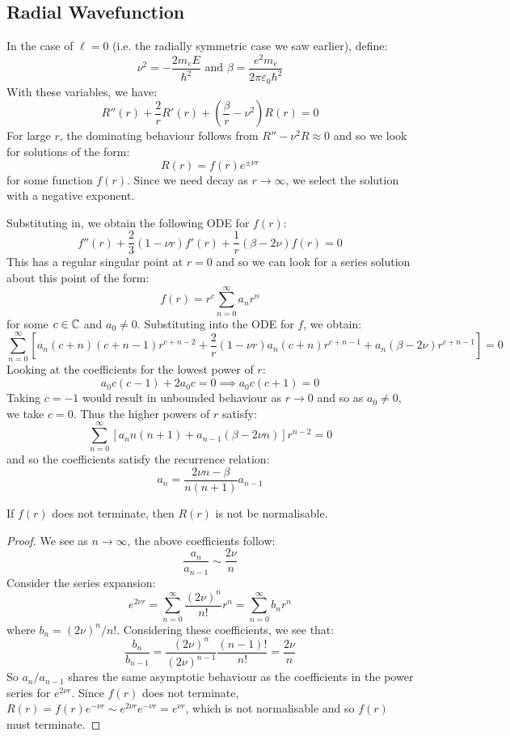 \documentclass[../main.tex]{subfiles}
\begin{document}
\subsection{Radial Wavefunction} \label{radialWF}
In the case of $\ell = 0$ (i.e. the radially symmetric case we saw earlier), define:
\[
  \nu^2 = -\frac{2m_eE}{\hbar^2} \text{ and } \beta = \frac{e^2m_e}{2\pi\varepsilon_0 \hbar^2}
\]
With these variables, we have:
\[
  R''(r) + \frac{2}{r}R'(r) + \left(\frac{\beta}{r} - \nu^2\right)R(r) = 0
\]
For large $r$, the dominating behaviour follows from $R'' - \nu^2 R \approx 0$ and so we look for solutions of the form:
\[
  R(r) = f(r) e^{\pm\nu r}
\]
for some function $f(r)$.
Since we need decay as $r \to \infty$, we select the solution with a negative exponent.

Substituting in, we obtain the following ODE for $f(r)$:
\[
  f''(r) + \frac{2}{3}(1 - \nu r)f'(r) + \frac{1}{r}(\beta - 2\nu) f(r) = 0
\]
This has a regular singular point at $r = 0$ and so we can look for a series solution about this point of the form:
\[
  f(r) = r^{c} \sum_{n = 0}^{\infty} a_n r^{n}
\]
for some $c \in \mathbb{C}$ and $a_0 \neq 0$.
Substituting into the ODE for $f$, we obtain:
\[
  \sum_{n = 0}^{\infty} \left[a_n(c + n)(c + n - 1)r^{c + n - 2} + \frac{2}{r}(1 - \nu r)a_n(c + n)r^{c + n - 1} + a_n(\beta - 2\nu)r^{c + n - 1}\right] = 0
\]
Looking at the coefficients for the lowest power of $r$:
\[
  a_0 c(c - 1) + 2a_0 c = 0 \implies a_0 c(c + 1) = 0
\]
Taking $c = -1$ would result in unbounded behaviour as $r \to 0$ and so as $a_0 \neq 0$, we take $c = 0$.
Thus the higher powers of $r$ satisfy:
\[
  \sum_{n = 0}^{\infty} \left[a_n n(n + 1) + a_{n - 1}(\beta - 2\nu n)\right]r^{n - 2} = 0
\]
and so the coefficients satisfy the recurrence relation:
\[
  a_n = \frac{2\nu n - \beta}{n(n + 1)}  a_{n - 1}
\]
\begin{proposition}
  If $f(r)$ does not terminate, then $R(r)$ is not be normalisable.
\end{proposition}
\begin{proof}
  We see as $n \to \infty$, the above coefficients follow:
  \[
    \frac{a_n}{a_{n - 1}} \sim \frac{2\nu}{n}
  \]
  Consider the series expansion:
  \[
    e^{2\nu r} = \sum_{n = 0}^{\infty} \frac{(2\nu)^{n}}{n!}r^{n} = \sum_{n = 0}^{\infty} b_n r^{n}
  \]
  where $b_n = (2\nu)^{n}/n!$.
  Considering these coefficients, we see that:
  \[
    \frac{b_n}{b_{n - 1}} = \frac{(2\nu)^{n}}{(2\nu)^{n - 1}} \frac{(n - 1)!}{n!} = \frac{2\nu}{n}
  \]
  So $a_n/a_{n-1}$ shares the same asymptotic behaviour as the coefficients in the power series for $e^{2\nu r}$.
  Since $f(r)$ does not terminate, $R(r) = f(r)e^{-\nu r} \sim e^{2\nu r} e^{-\nu r} = e^{\nu r}$, which is not normalisable and so $f(r)$ must terminate.
\end{proof}
\end{document}
